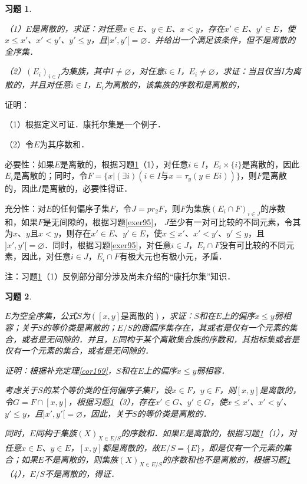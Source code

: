 \documentclass[12pt, a4paper, oneside]{book}
\newtheorem{exer}{习题}
\begin{document}
			\begin{exer}\label{exer96}
				\hfill\par
				（1）$E$是离散的，求证：对任意$x\in E$、$y\in E$、$x<y$，存在$x'\in E$、$y'\in E$，使$x\leq x'$、$x'<y'$、$y'\leq y$，且$]x', y'[=\varnothing$．并给出一个满足该条件，但不是离散的全序集．
				\par
				（2）$(E_i)_{i\in I}$为集族，其中$I\neq \varnothing$，对任意$i\in I$，$E_i\neq \varnothing$，求证：当且仅当$I$为离散的，并且对任意$i\in I$，$E_i$为离散的，该集族的序数和是离散的，
			\end{exer}
			证明：
			\par
			（1）根据定义可证．康托尔集是一个例子．
			\par
			（2）令$E$为其序数和．
			\par
			必要性：如果$E$是离散的，根据习题\ref{exer96}（1），对任意$i\in I$，$E_i\times \{i\}$是离散的，因此$E_i$是离散的；同时，令$F=\{x|(\exists i)(i\in I\text{与}x=\tau_y(y\in Ei))\}$，则$F$是离散的，因此$I$是离散的，必要性得证．
			\par
			充分性：对$E$的任何偏序子集$F$，令$J=pr_2F$，则$F$为集族$(E_i\cap F)_{i\in J}$的序数和，如果$F$是无间隙的，根据习题\ref{exer95}， $J$至少有一对可比较的不同元素，令其为$x$、$y$且$x<y$，则存在$x'\in E$、$y'\in E$，使$x\leq x'$、$x'<y'$、$y'\leq y$，且$]x', y'[=\varnothing$．同时，根据习题\ref{exer95}，对任意$i\in J$，$E_i\cap F$没有可比较的不同元素，因此，对任意$i\in J$，$E_i\cap F$有极大元也有极小元，矛盾．
			\par
			注：习题\ref{exer96}（1）反例部分部分涉及尚未介绍的“康托尔集”知识．

			\begin{exer}\label{exer97}
				\hfill\par
				$E$为空全序集，公式$S$为$([x, y]\text{是离散的})$，求证：$S$和在$E$上的偏序$x\leq y$弱相容；关于$S$的等价类是离散的；$E/S$的商偏序集存在，其或者是仅有一个元素的集合，或者是无间隙的．并且，$E$同构于某个离散集合族的序数和，其指标集或者是仅有一个元素的集合，或者是无间隙的．
				\par
				证明：根据补充定理\ref{cor169}，$S$和在$E$上的偏序$x\leq y$弱相容．
				\par
				考虑关于$S$的某个等价类的任何偏序子集$F$，设$x\in F$，$y\in F$，则$[x, y]$是离散的，令$G=F\cap [x, y]$，根据习题\ref{exer96}（3），存在$x'\in G$、$y'\in G$，使$x\leq x'$、$x'<y'$、$y'\leq y$，且$]x', y'[=\varnothing$，因此，关于$S$的等价类是离散的．
				\par
				同时，$E$同构于集族$(X)_{X\in E/S}$的序数和．如果$E$是离散的，根据习题\ref{exer96}（1），对任意$x\in E$、$y\in E$，$[x, y]$都是离散的，故$E/S=\{E\}$，即是仅有一个元素的集合；如果$E$不是离散的，则集族$(X)_{X\in E/S}$的序数和也不是离散的，根据习题\ref{exer96}（4），$E/S$不是离散的，得证．
			\end{exer}
			
\end{document}
